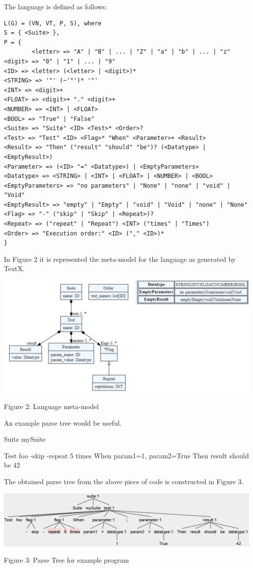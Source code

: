 The language is defined as follows:
\begin{verbatim}
L(G) = (VN, VT, P, S), where
S = { <Suite> },
P = {
		<letter> => "A" | "B" | ... | "Z" | "a" | "b" | ... | "z"
<digit> => "0" | "1" | ... | "9"
<ID> => <letter> (<letter> | <digit>)*
<STRING> => '"' (~'"')* '"'
<INT> => <digit>+
<FLOAT> => <digit>+ "." <digit>+
<NUMBER> => <INT> | <FLOAT>
<BOOL> => "True" | "False"
<Suite> => "Suite" <ID> <Test>* <Order>?
<Test> => "Test" <ID> <Flag>* "When" <Parameter>+ <Result>
<Result> => "Then" ("result" "should" "be")? (<Datatype> | <EmptyResult>)
<Parameter> => (<ID> "=" <Datatype>) | <EmptyParameters>
<Datatype> => <STRING> | <INT> | <FLOAT> | <NUMBER> | <BOOL>
<EmptyParameters> => "no parameters" | "None" | "none" | "void" | "Void"
<EmptyResult> => "empty" | "Empty" | "void" | "Void" | "none" | "None"
<Flag> => "-" ("skip" | "Skip" | <Repeat>)?
<Repeat> => ("repeat" | "Repeat") <INT> ("times" | "Times")
<Order> => "Execution order:" <ID> ("," <ID>)*
}
\end{verbatim}

In Figure 2 it is represented the meta-model for the language as generated by TextX.

{ \centering \includegraphics[width=\textwidth]{images/metamodel.png} }
\begin{center} Figure 2: Language meta-model  \end{center}

An example parse tree would be useful.

Suite mySuite

Test foo -skip -repeat 5 times
When param1=1, param2=True
Then result should be 42

The obtained parse tree from the above piece of code is constructed in Figure 3.

{ \centering \includegraphics[width=\textwidth]{images/parse_tree.png} }
\begin{center} Figure 3: Parse Tree for example program \end{center}
